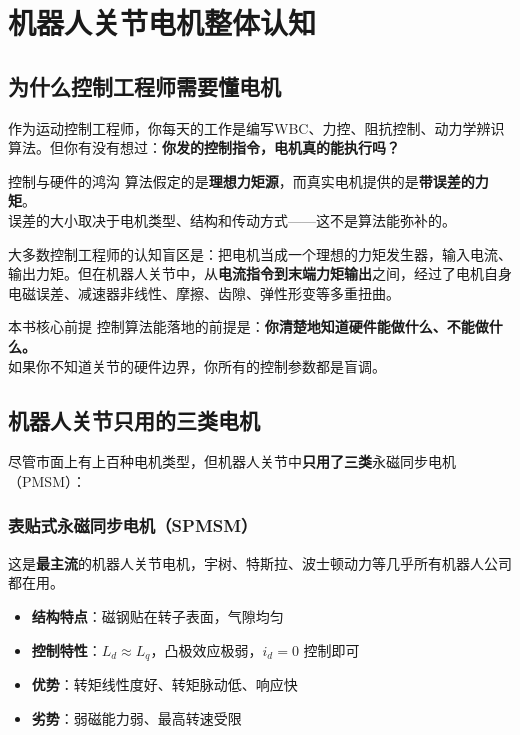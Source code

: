 \chapter{机器人关节电机整体认知}
\label{ch:overview}

\section{为什么控制工程师需要懂电机}

作为运动控制工程师，你每天的工作是编写WBC、力控、阻抗控制、动力学辨识算法。但你有没有想过：\textbf{你发的控制指令，电机真的能执行吗？}

\begin{keyinsight}{控制与硬件的鸿沟}
算法假定的是\textbf{理想力矩源}，而真实电机提供的是\textbf{带误差的力矩}。\\
误差的大小取决于电机类型、结构和传动方式——这不是算法能弥补的。
\end{keyinsight}

大多数控制工程师的认知盲区是：把电机当成一个理想的力矩发生器，输入电流、输出力矩。但在机器人关节中，从\textbf{电流指令到末端力矩输出}之间，经过了电机自身电磁误差、减速器非线性、摩擦、齿隙、弹性形变等多重扭曲。

\begin{engineeringbox}{本书核心前提}
控制算法能落地的前提是：\textbf{你清楚地知道硬件能做什么、不能做什么。}\\
如果你不知道关节的硬件边界，你所有的控制参数都是盲调。
\end{engineeringbox}

\section{机器人关节只用的三类电机}

尽管市面上有上百种电机类型，但机器人关节中\textbf{只用了三类}永磁同步电机（PMSM）：

\subsection{表贴式永磁同步电机（SPMSM）}

这是\textbf{最主流}的机器人关节电机，宇树、特斯拉、波士顿动力等几乎所有机器人公司都在用。

\begin{itemize}
  \item \textbf{结构特点}：磁钢贴在转子表面，气隙均匀
  \item \textbf{控制特性}：$L_d \approx L_q$，凸极效应极弱，$i_d=0$ 控制即可
  \item \textbf{优势}：转矩线性度好、转矩脉动低、响应快
  \item \textbf{劣势}：弱磁能力弱、最高转速受限
\end{itemize}

